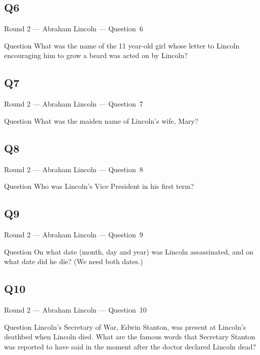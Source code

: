 \documentclass[11pt]{beamer}
\begin{document}
\subsection*{Q6}
\begin{frame}[t]{Round 2 --- Abraham Lincoln --- \mbox{Question 6}}
\vspace{-0.5em}
\begin{block}{Question}
What was the name of the 11 year-old girl whose letter to Lincoln encouraging him to grow a beard was acted on by Lincoln?
\end{block}
\end{frame}
\subsection*{Q7}
\begin{frame}[t]{Round 2 --- Abraham Lincoln --- \mbox{Question 7}}
\vspace{-0.5em}
\begin{block}{Question}
What was the maiden name of Lincoln's wife, Mary?
\end{block}
\end{frame}
\subsection*{Q8}
\begin{frame}[t]{Round 2 --- Abraham Lincoln --- \mbox{Question 8}}
\vspace{-0.5em}
\begin{block}{Question}
Who was Lincoln's Vice President in his first term? 
\end{block}
\end{frame}
\subsection*{Q9}
\begin{frame}[t]{Round 2 --- Abraham Lincoln --- \mbox{Question 9}}
\vspace{-0.5em}
\begin{block}{Question}
On what date (month, day and year) was Lincoln assassinated, and on what date did he die? (We need both dates.)
\end{block}
\end{frame}
\subsection*{Q10}
\begin{frame}[t]{Round 2 --- Abraham Lincoln --- \mbox{Question 10}}
\vspace{-0.5em}
\begin{block}{Question}
Lincoln's Secretary of War, Edwin Stanton, was present at Lincoln's deathbed when Lincoln died.  What are the  famous words that Secretary Stanton was reported to have said in the moment after the doctor declared Lincoln dead?
\end{block}
\end{frame}
\end{document}
